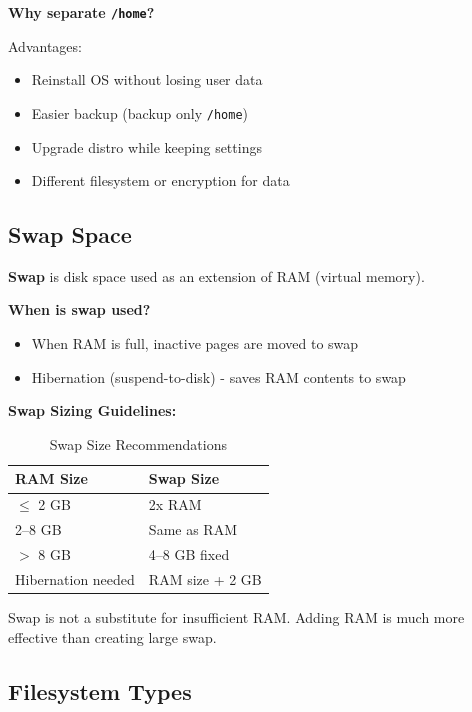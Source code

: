 \begin{tipbox}
\textbf{Why separate \texttt{/home}?}

Advantages:
\begin{itemize}
    \item Reinstall OS without losing user data
    \item Easier backup (backup only \texttt{/home})
    \item Upgrade distro while keeping settings
    \item Different filesystem or encryption for data
\end{itemize}
\end{tipbox}

\subsection{Swap Space}

\textbf{Swap} is disk space used as an extension of RAM (virtual memory).

\textbf{When is swap used?}
\begin{itemize}
    \item When RAM is full, inactive pages are moved to swap
    \item Hibernation (suspend-to-disk) - saves RAM contents to swap
\end{itemize}

\textbf{Swap Sizing Guidelines:}

\begin{table}[htbp]
    \centering
    \caption{Swap Size Recommendations}
    \label{tab:swap-sizing}
    \begin{tabular}{@{}ll@{}}
        \toprule
        \textbf{RAM Size} & \textbf{Swap Size} \\
        \midrule
        $\leq$ 2 GB & 2x RAM \\
        2--8 GB & Same as RAM \\
        $>$ 8 GB & 4--8 GB fixed \\
        Hibernation needed & RAM size + 2 GB \\
        \bottomrule
    \end{tabular}
\end{table}

\begin{warningbox}
Swap is not a substitute for insufficient RAM. Adding RAM is much more effective than creating large swap.
\end{warningbox}

\subsection{Filesystem Types}

